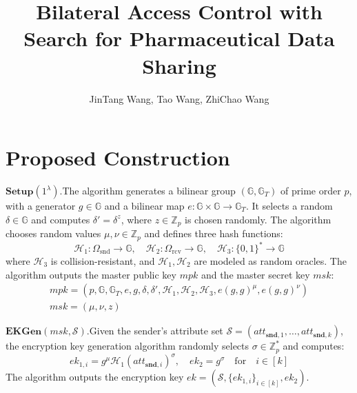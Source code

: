 \documentclass[runningheads]{llncs}
\begin{document}
%
\title{Bilateral Access Control with Search for Pharmaceutical Data Sharing}
%
%
\author{JinTang Wang, Tao Wang, ZhiChao Wang}

%
%
\maketitle              %
%
\section{Proposed Construction}
$\mathbf{Setup}(1^\lambda).$The algorithm generates a bilinear group $(\mathbb{G}, \mathbb{G}_T)$ of prime order $p$, with a generator $g \in \mathbb{G}$ and a bilinear map $e: \mathbb{G} \times \mathbb{G} \rightarrow \mathbb{G}_T$. It selects a random $\delta \in \mathbb{G}$ and computes $\delta' = \delta^z$, where $z \in \mathbb{Z}_p$ is chosen randomly. The algorithm chooses random values $\mu, \nu \in \mathbb{Z}_p$ and defines three hash functions:
$$
\mathcal{H}_1: \Omega_{\mathrm{snd}} \rightarrow \mathbb{G}, \quad \mathcal{H}_2: \Omega_{\mathrm{rcv}} \rightarrow \mathbb{G}, \quad \mathcal{H}_3: \{0,1\}^* \rightarrow \mathbb{G}
$$
where $\mathcal{H}_3$ is collision-resistant, and $\mathcal{H}_1, \mathcal{H}_2$ are modeled as random oracles. The algorithm outputs the master public key $mpk$ and the master secret key $msk$:
\begin{gather*}
mpk = (p, \mathbb{G}, \mathbb{G}_T, e, g, \delta, \delta', \mathcal{H}_1, \mathcal{H}_2, \mathcal{H}_3, e(g,g)^\mu, e(g,g)^\nu)\\
msk = (\mu, \nu, z)
\end{gather*}

$\mathbf{EKGen}(msk, \mathcal{S}).$Given the sender's attribute set $\mathcal{S} = (att_{\mathbf{snd},1}, \ldots, att_{\mathbf{snd},k})$, the encryption key generation algorithm randomly selects $\sigma \in \mathbb{Z}_p^*$ and computes:
$$ek_{1,i} = g^\mu \mathcal{H}_1(att_{\mathbf{snd},i})^\sigma, \quad ek_2 = g^\sigma \quad \text{for} \quad i \in [k]$$
The algorithm outputs the encryption key $ ek = (\mathcal{S}, \{ ek_{1,i} \}_{i \in [k]}, ek_2) $.
\end{document}
